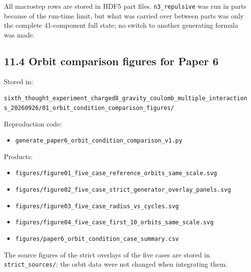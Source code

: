 \documentclass[
  a4paper,
]{article}
\providecommand{\tightlist}{%
  \setlength{\itemsep}{0pt}\setlength{\parskip}{0pt}}
\begin{document}
All macrostep rows are stored in HDF5 part files. \texttt{n3\_repulsive}
was run in parts because of the run-time limit, but what was carried
over between parts was only the complete 41-component full state; no
switch to another generating formula was made.

\subsection{11.4 Orbit comparison figures for Paper
6}\label{orbit-comparison-figures-for-paper-6}

Stored in:

\texttt{sixth\_\allowbreak{}thought\_\allowbreak{}experiment\_\allowbreak{}charged8\_\allowbreak{}gravity\_\allowbreak{}coulomb\_\allowbreak{}multiple\_\allowbreak{}interactions\_\allowbreak{}20260926/\allowbreak{}01\_\allowbreak{}orbit\_\allowbreak{}condition\_\allowbreak{}comparison\_\allowbreak{}figures/\allowbreak{}}

Reproduction code:

\begin{itemize}
\tightlist
\item
  \texttt{generate\_paper6\_orbit\_condition\_comparison\_v1.py}
\end{itemize}

Products:

\begin{itemize}
\tightlist
\item
  \texttt{figures/\allowbreak{}figure01\_\allowbreak{}five\_\allowbreak{}case\_\allowbreak{}reference\_\allowbreak{}orbits\_\allowbreak{}same\_\allowbreak{}scale.svg}
\item
  \texttt{figures/\allowbreak{}figure02\_\allowbreak{}five\_\allowbreak{}case\_\allowbreak{}strict\_\allowbreak{}generator\_\allowbreak{}overlay\_\allowbreak{}panels.svg}
\item
  \texttt{figures/\allowbreak{}figure03\_\allowbreak{}five\_\allowbreak{}case\_\allowbreak{}radius\_\allowbreak{}vs\_\allowbreak{}cycles.svg}
\item
  \texttt{figures/\allowbreak{}figure04\_\allowbreak{}five\_\allowbreak{}case\_\allowbreak{}first\_\allowbreak{}10\_\allowbreak{}orbits\_\allowbreak{}same\_\allowbreak{}scale.svg}
\item
  \texttt{figures/\allowbreak{}paper6\_\allowbreak{}orbit\_\allowbreak{}condition\_\allowbreak{}case\_\allowbreak{}summary.csv}
\end{itemize}

The source figures of the strict overlays of the five cases are stored
in \texttt{strict\_\allowbreak{}sources/\allowbreak{}}; the orbit data were not changed when
integrating them.
\end{document}
